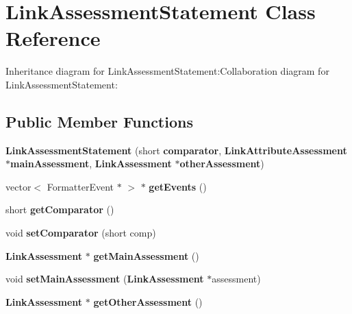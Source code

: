 \section{LinkAssessmentStatement Class Reference}
\label{classbr_1_1pucrio_1_1telemidia_1_1ginga_1_1ncl_1_1model_1_1link_1_1LinkAssessmentStatement}
Inheritance diagram for LinkAssessmentStatement:Collaboration diagram for LinkAssessmentStatement:\subsection*{Public Member Functions}
\begin{CompactItemize}
\item 
\textbf{LinkAssessmentStatement} (short {\bf comparator}, {\bf LinkAttributeAssessment} $\ast${\bf mainAssessment}, {\bf LinkAssessment} $\ast${\bf otherAssessment})\label{classbr_1_1pucrio_1_1telemidia_1_1ginga_1_1ncl_1_1model_1_1link_1_1LinkAssessmentStatement_5d85f428d169d7af783b2491ff056b0f}

\item 
vector$<$ FormatterEvent $\ast$ $>$ $\ast$ \textbf{getEvents} ()\label{classbr_1_1pucrio_1_1telemidia_1_1ginga_1_1ncl_1_1model_1_1link_1_1LinkAssessmentStatement_fca757079125047461ec5a835b328ae7}

\item 
short \textbf{getComparator} ()\label{classbr_1_1pucrio_1_1telemidia_1_1ginga_1_1ncl_1_1model_1_1link_1_1LinkAssessmentStatement_593ff47e24e3cbe61ed1ac19668333b6}

\item 
void \textbf{setComparator} (short comp)\label{classbr_1_1pucrio_1_1telemidia_1_1ginga_1_1ncl_1_1model_1_1link_1_1LinkAssessmentStatement_8b196bbf9521faf73cd2b1316e5b1359}

\item 
{\bf LinkAssessment} $\ast$ \textbf{getMainAssessment} ()\label{classbr_1_1pucrio_1_1telemidia_1_1ginga_1_1ncl_1_1model_1_1link_1_1LinkAssessmentStatement_19911d33a332b5b117b60fc7ef84f523}

\item 
void \textbf{setMainAssessment} ({\bf LinkAssessment} $\ast$assessment)\label{classbr_1_1pucrio_1_1telemidia_1_1ginga_1_1ncl_1_1model_1_1link_1_1LinkAssessmentStatement_fa310c74f584f3c97cb3df241d56d0c3}

\item 
{\bf LinkAssessment} $\ast$ \textbf{getOtherAssessment} ()\label{classbr_1_1pucrio_1_1telemidia_1_1ginga_1_1ncl_1_1model_1_1link_1_1LinkAssessmentStatement_c79022f7140a530c804f0b8a0d402a8c}


\end{CompactItemize}
